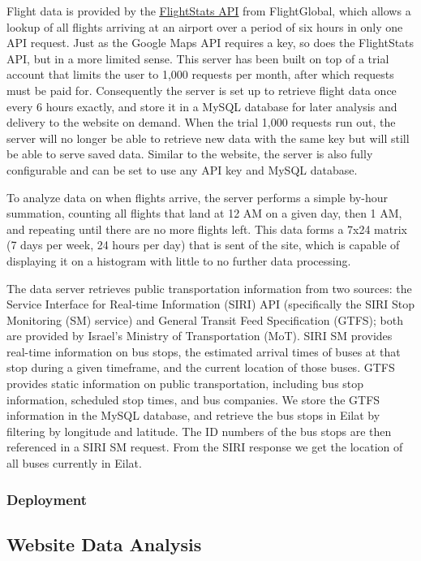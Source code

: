\documentclass[12pt]{article}                       %
\begin{document}
Flight data is provided by the \underline{\href{https://www.flightstats.com/v2/}{FlightStats API}} from FlightGlobal, which allows a lookup of all flights arriving at an airport over a period of six hours in only one API request. Just as the Google Maps API requires a key, so does the FlightStats API, but in a more limited sense. This server has been built on top of a trial account that limits the user to 1,000 requests per month, after which requests must be paid for. Consequently the server is set up to retrieve flight data once every 6 hours exactly, and store it in a MySQL database for later analysis and delivery to the website on demand. When the trial 1,000 requests run out, the server will no longer be able to retrieve new data with the same key but will still be able to serve saved data. Similar to the website, the server is also fully configurable and can be set to use any API key and MySQL database.

To analyze data on when flights arrive, the server performs a simple by-hour summation, counting all flights that land at 12 AM on a given day, then 1 AM, and repeating until there are no more flights left. This data forms a 7x24 matrix (7 days per week, 24 hours per day) that is sent of the site, which is capable of displaying it on a histogram with little to no further data processing.

The data server retrieves public transportation information from two sources: the Service Interface for Real-time Information (SIRI) API (specifically the SIRI Stop Monitoring (SM) service) and General Transit Feed Specification (GTFS); both are provided by Israel's Ministry of Transportation (MoT). SIRI SM provides real-time information on bus stops, the estimated arrival times of buses at that stop during a given timeframe, and the current location of those buses. GTFS provides static information on public transportation, including bus stop information, scheduled stop times, and bus companies. We store the GTFS information in the MySQL database, and retrieve the bus stops in Eilat by filtering by longitude and latitude. The ID numbers of the bus stops are then referenced in a SIRI SM request. From the SIRI response we get the location of all buses currently in Eilat.


\subsubsection{Deployment}


\subsection{Website Data Analysis}

\newpage


\end{document}
